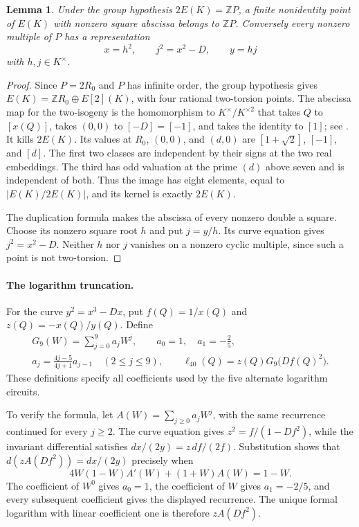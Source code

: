 \documentclass[11pt,a4paper]{article}
\newtheorem{lemma}[theorem]{Lemma}
\theoremstyle{definition}
\theoremstyle{remark}
\begin{document}
\begin{lemma}\label{lem:square-abscissa-cyclic}
Under the group hypothesis $2E(K)=\mathbb ZP$, a finite
nonidentity point of $E(K)$ with nonzero square abscissa belongs
to $\mathbb ZP$. Conversely every nonzero multiple of $P$ has
a representation
\[
             x=h^2,\qquad j^2=x^2-D,\qquad y=hj
\]
with $h,j\in K^\times$.
\end{lemma}
\begin{proof}
Since $P=2R_0$ and $P$ has infinite order, the group hypothesis
gives $E(K)=\mathbb ZR_0\oplus E[2](K)$, with four rational
two-torsion points. The abscissa map for the two-isogeny is the
homomorphism to $K^\times/K^{\times2}$ that takes $Q$ to
$[x(Q)]$, takes $(0,0)$ to $[-D]=[-1]$, and takes the identity
to $[1]$; see \cite[Chapter X, Section 4]{Silverman2009}.
It kills $2E(K)$. Its values at $R_0$, $(0,0)$, and $(d,0)$
are $[1+\sqrt2]$, $[-1]$, and $[d]$.
The first two classes are independent by their signs at the
two real embeddings. The third has odd valuation at the prime
$(d)$ above seven and is independent of both. Thus the image
has eight elements, equal to $|E(K)/2E(K)|$, and its kernel
is exactly $2E(K)$.

The duplication formula makes the abscissa of every nonzero
double a square. Choose its nonzero square root $h$ and put
$j=y/h$. Its curve equation gives $j^2=x^2-D$.
Neither $h$ nor $j$ vanishes on a nonzero cyclic multiple,
since such a point is not two-torsion.
\end{proof}

\paragraph{The logarithm truncation.}
For the curve $y^2=x^3-Dx$, put $f(Q)=1/x(Q)$ and
$z(Q)=-x(Q)/y(Q)$. Define
\[
 \begin{gathered}
 G_9(W)=\sum_{j=0}^{9}a_jW^j,\qquad
 a_0=1,\quad a_1=-\frac25,\\
 a_j=\frac{4j-5}{4j+1}a_{j-1}\quad(2\le j\le9),\qquad
 \ell_{40}(Q)=z(Q)G_9\bigl(Df(Q)^2\bigr).
 \end{gathered}
\]
These definitions specify all coefficients used by the five alternate
logarithm circuits.

To verify the formula, let $A(W)=\sum_{j\ge0}a_jW^j$, with the
same recurrence continued for every $j\ge2$. The curve equation gives
$z^2=f/(1-Df^2)$, while the invariant differential satisfies
$dx/(2y)=z\,df/(2f)$. Substitution shows that
$d(zA(Df^2))=dx/(2y)$ precisely when
\[
                 4W(1-W)A'(W)+(1+W)A(W)=1-W.
\]
The coefficient of $W^0$ gives $a_0=1$, the coefficient of $W$
gives $a_1=-2/5$, and every subsequent coefficient gives the displayed
recurrence. The unique formal logarithm with linear coefficient one
is therefore $zA(Df^2)$.
\end{document}
